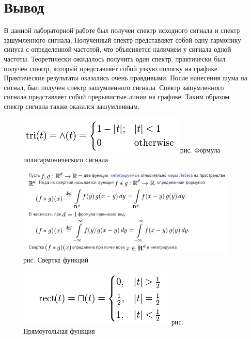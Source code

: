 \documentclass[10pt,a4paper]{report}
\begin{document}
\section{Вывод}
В данной лабораторной работе был получен спектр исходного сигнала и спектр зашумленного сигнала. Полученный спектр представляет собой одну гармонику синуса с определенной частотой, что объясняется наличием у сигнала одной частоты. Теоретически ожидалось получить один спектр, практически был получен спектр, который представляет собой узкую полоску на графике. Практические результаты оказались очень правдивыми. После нанесения шума на сигнал, был получен спектр зашумленного сигнала. Спектр зашумленного сигнала представляет собой прерывистые линии на графике. Таким образом спектр сигнала также оказался зашумленным. \newline
\begin{figure}
\begin{center}
\includegraphics[angle=0, scale = 0.8]{17.png}\newline
рис.     Формула полигармонического сигнала\newline
\end{center}
\end{figure}
\begin{figure}
\begin{center}
\includegraphics[angle=0, scale = 0.8]{18.png}\newline
рис.   Свертка функций
\end{center}
\end{figure}
\begin{figure}
\begin{center}
\includegraphics[angle=0, scale = 0.8]{19.png}\newline
рис.    Прямоугольная функция
\end{center}
\end{figure}
\end{document}
